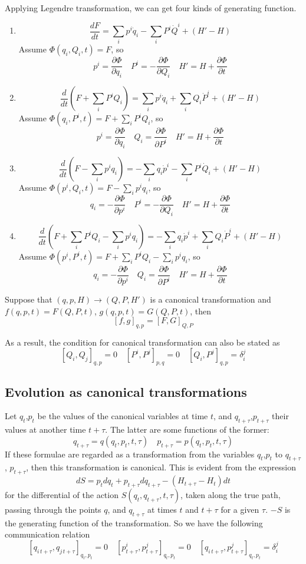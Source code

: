 Applying Legendre transformation, we can get four kinds of generating function. 
\begin{enumerate}
\item \[\frac{dF}{dt} = \sum_i p^i \dot{q}_i - \sum_i P^i \dot{Q}^i + (H'-H)\]
Assume $\Phi(q_i,Q_i,t) = F$, so
\[p^i = \frac{\partial \Phi}{\partial q_i} \quad P^i = -\frac{\partial \Phi}{\partial Q_i} \quad H' = H + \frac{\partial \Phi}{\partial t}\]

\item \[\frac{d}{dt}(F+\sum_i P^i Q_i) = \sum_i p^i \dot{q}_i + \sum_i Q_i \dot{P}^i + (H'-H)\]
Assume $\Phi(q_i,P^i,t) = F + \sum_i P^i Q_i$, so
\[p^i = \frac{\partial \Phi}{\partial q_i} \quad Q_i = \frac{\partial \Phi}{\partial P^i} \quad H' = H + \frac{\partial \Phi}{\partial t}\]

\item \[\frac{d}{dt}(F-\sum_i p^i q_i) = -\sum_i q_i \dot{p}^i - \sum_i P^i \dot{Q}_i + (H'-H)\]
Assume $\Phi(p^i,Q_i,t) = F - \sum_i p^i q_i$, so
\[q_i = -\frac{\partial \Phi}{\partial p^i} \quad P^i = -\frac{\partial \Phi}{\partial Q_i} \quad H' = H + \frac{\partial \Phi}{\partial t}\]

\item \[\frac{d}{dt}(F+\sum_i P^i Q_i-\sum_i p^i q_i) = -\sum_i q_i \dot{p}^i + \sum_i Q_i \dot{P}^i + (H'-H)\]
Assume $\Phi(p^i,P^i,t) = F+\sum_i P^i Q_i-\sum_i p^i q_i$, so
\[q_i = -\frac{\partial \Phi}{\partial p^i} \quad Q_i = \frac{\partial \Phi}{\partial P^i} \quad H' = H + \frac{\partial \Phi}{\partial t}\]
\end{enumerate}

\begin{newthem}
Suppose that $(q,p,H) \to (Q,P,H')$ is a canonical transformation and $f(q,p,t) = F(Q,P,t)$, $g(q,p,t) = G(Q,P,t)$, then
\[[f,g]_{q,p} = [F,G]_{Q,P}\]
\end{newthem}
As a result, the condition for canonical transformation can also be stated as
\[[Q_i,Q_j]_{q,p} = 0 \quad [P^i,P^j]_{p,q} = 0 \quad [Q_i,P^j]_{q,p} = \delta_i^j\]

\subsection{Evolution as canonical transformations}
Let $q_t$,$p_t$ be the values of the canonical variables at time $t$, and $q_{t+\tau}$,$p_{t+\tau}$ their values at another time $t+\tau$. The latter are some functions of the former:
\[q_{t+\tau} = q(q_t,p_t,t,\tau) \quad p_{t+\tau} = p(q_t,p_t,t,\tau)\]
If these formulae are regarded as a transformation from the variables $q_t$,$p_t$ to $q_{t+\tau}$, $p_{t+\tau}$, then this transformation is canonical. This is evident from the
expression
\[dS = p_t dq_t + p_{t+\tau} dq_{t+\tau} -(H_{t+\tau}-H_t)dt\]
for the differential of the action $S(q_t,q_{t+\tau},t,\tau)$, taken along the true path, passing through the points $q$, and $q_{t+\tau}$ at times $t$ and $t+\tau$ for a given $\tau$. $-S$ is the generating function of the transformation. So we have the following communication relation
\[[q_{i\,t+\tau},q_{j\,t+\tau}]_{q_t,p_t} = 0 \quad [p^i_{t+\tau},p^j_{t+\tau}]_{q_t,p_t} = 0 \quad [q_{i\,t+\tau},p^j_{t+\tau}]_{q_t,p_t} = \delta_i^j\]


